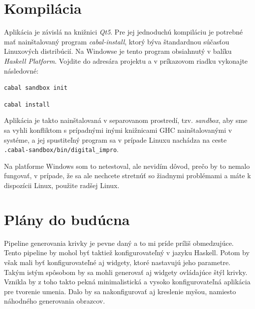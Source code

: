 \documentclass[11pt,a4paper]{article}
\begin{document}
\section{Kompilácia}

Aplikácia je závislá na knižnici \emph{Qt5}. Pre jej jednoduchú kompiláciu je
potrebné mať nainštalovaný program \emph{cabal-install}, ktorý býva štandardnou
súčasťou Linuxových distribúcií. Na Windowse je tento program obsiahnutý v
balíku \emph{Haskell Platform}. Vojdite do adresára projektu a v príkazovom
riadku vykonajte následovné:

\texttt{cabal sandbox init}

\texttt{cabal install}

Aplikácia je takto nainštalovaná v separovanom prostredí, tzv. \emph{sandbox},
aby sme sa vyhli konfliktom s prípadnými inými knižnicami GHC nainštalovanými v
systéme, a jej spustiteľný program sa v prípade Linuxu nachádza na ceste
\texttt{.cabal-sandbox/bin/digital\_impro}.

Na platforme Windows som to netestoval, ale nevidím dôvod, prečo by to nemalo
fungovať, v prípade, že sa ale nechcete stretnúť so žiadnymi problémami a máte k
dispozícii Linux, použite radšej Linux.

\section{Plány do budúcna}

Pipeline generovania krivky je pevne daný a to mi príde príliš obmedzujúce.
Tento pipeline by mohol byť taktiež konfigurovateľný v jazyku Haskell. Potom by
však mali byť konfigurovateľné aj widgety, ktoré nastavujú jeho parametre. Takým
istým spôsobom by sa mohli generovať aj widgety ovládajúce štýl krivky. Vznikla
by z toho takto pekná minimalistická a vysoko konfigurovateľná aplikácia pre
tvorenie umenia. Dalo by sa nakonfigurovať aj kreslenie myšou, namiesto
náhodného generovania obrazcov.
\end{document}
